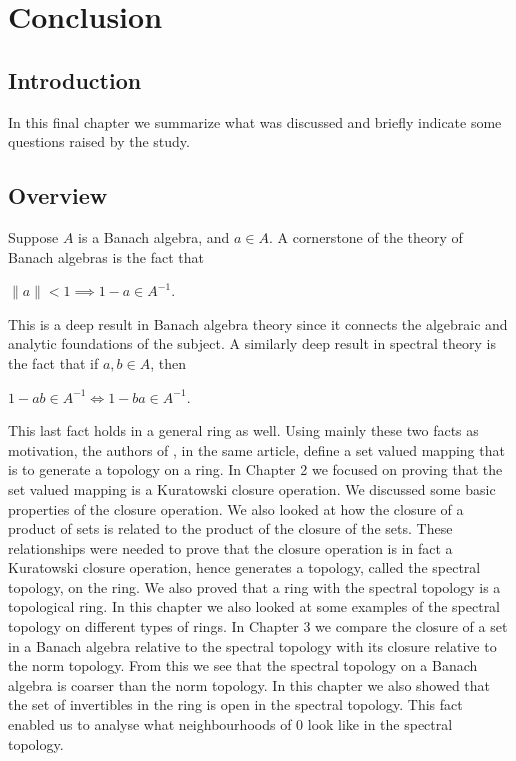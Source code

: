 \documentclass[12pt, oneside]{book}
\begin{document}
\chapter{Conclusion}
\section{Introduction}
\noindent In this final chapter we summarize what was discussed and briefly indicate some 
questions raised by the study. 
\section{Overview}
\noindent Suppose $A$ is a Banach algebra, and $a \in A$. A cornerstone of the theory 
of Banach algebras is the fact that
\begin{center}
$\|a\| < 1 \implies 1 - a \in A^{-1}$.
\end{center}
\noindent This is a deep result in Banach algebra theory since it connects the algebraic 
and analytic foundations of the subject. A similarly deep result in spectral theory is the 
fact that if $a, b \in A$, then
\begin{center}
$1 - ab \in A^{-1} \iff 1 - ba \in A^{-1}$.
\end{center}
\noindent This last fact holds in a general ring as well. Using mainly these two facts 
as motivation, the authors of \cite{CH3}, in the same article, define a set valued mapping that is 
to generate a topology on a ring. 
\vskip 0.3cm
\noindent In Chapter 2 we focused on proving that the set valued mapping is a Kuratowski closure 
operation. We discussed some basic properties of the closure operation. We also looked at how the 
closure of a product of sets is related to the product of the closure of the sets. 
These relationships were needed to prove that the closure operation is in fact a Kuratowski closure
operation, hence generates a topology, called the spectral topology, on the ring. We also proved that a ring with the spectral topology is a topological ring. In this chapter we also looked at some examples
of the spectral topology on different types of rings.
\vskip 0.3cm
\noindent In Chapter 3 we compare the closure of a set in a Banach algebra relative to the spectral
topology with its closure relative to the norm topology. From this we see that the spectral topology
on a Banach algebra is coarser than the norm topology. In this chapter we also showed that the set 
of invertibles in the ring is open in the spectral topology. This fact enabled us to analyse what neighbourhoods of 0 look like in the spectral topology.
\end{document}
